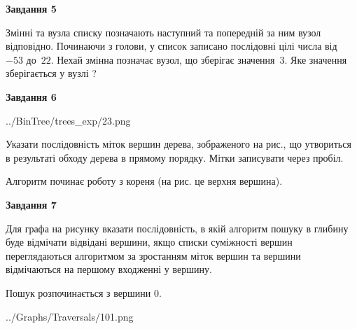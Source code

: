 \documentclass[12pt, ukrainian]{article}
\begin{document}
{\begin {large}
{\begin {center}\textbf{Завдання 5}\end {center}}\par
Змінні  та  вузла списку позначають наступний та попередній за ним вузол відповідно. Починаючи з голови, у список записано послідовні цілі числа від~$-53$ до~$22$. Нехай змінна  позначає вузол, що зберігає значення~$3$.
Яке значення зберігається у вузлі  ?\par
\newpage

{\begin {center}\textbf{Завдання 6}\end {center}}\par

\begin{center}
	{../BinTree/trees_exp/23.png}
\end{center}
Указати послідовність міток вершин дерева, зображеного на рис., що утвориться в результаті обходу дерева в прямому порядку. Мітки записувати через пробіл.\par Алгоритм починає роботу з кореня (на рис. це верхня вершина).\par
\newpage

{\begin {center}\textbf{Завдання 7}\end {center}}\par
Для графа на рисунку вказати послідовність, в якій алгоритм пошуку в глибину буде відмічати відвідані вершини, якщо списки суміжності вершин переглядаються алгоритмом за зростанням міток вершин та вершини відмічаються на першому вход\-женні у вершину.\par
Пошук розпочинається з вершини 0.\par

\begin{center}
	{../Graphs/Traversals/101.png}
\end{center}\par
\newpage


\end{large}}
\end{document}

